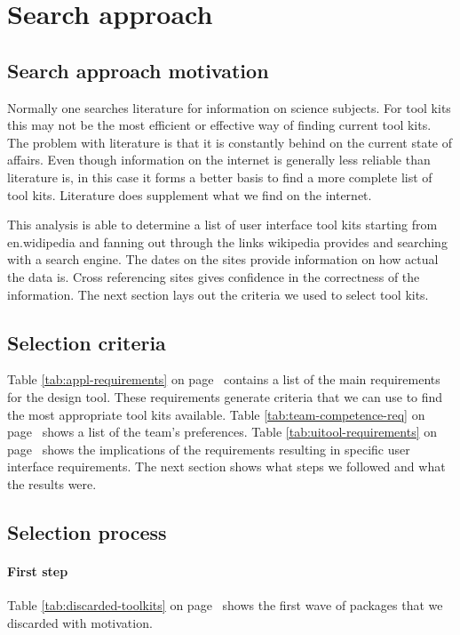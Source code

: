\section{Search approach}

\subsection{Search approach motivation}

Normally one searches literature for information on science subjects. 
For tool kits this may not be the most efficient or effective way of finding 
current tool kits. The problem with literature is that it is constantly
behind on the current state of affairs. Even though information on the internet 
is generally less reliable than literature is, in this case it forms a better 
basis to find a more complete list of tool kits. Literature does supplement 
what we find on the internet.

This analysis is able to determine a list of user interface tool kits starting 
from en.widipedia and fanning out through the links wikipedia provides and 
searching with a search engine. The dates on the sites provide information on how 
actual the data is. Cross referencing sites gives confidence in the correctness 
of the information. The next section lays out the criteria we used to select 
tool kits.

\subsection{Selection criteria}

Table \ref{tab:appl-requirements} on page~\pageref{tab:appl-requirements} contains 
a list of the main requirements for the design tool. These requirements generate 
criteria that we can use to find the most appropriate tool kits available. 
Table \ref{tab:team-competence-req} on page~\pageref{tab:team-competence-req}
shows a list of the team's preferences. Table \ref{tab:uitool-requirements} 
on page~\pageref{tab:uitool-requirements}
shows the implications of the requirements resulting in specific user interface 
requirements. The next section shows what steps we followed and what the results 
were.

\subsection{Selection process}

\paragraph{First step} Table \ref{tab:discarded-toolkits} on page~\pageref{tab:discarded-toolkits} shows the 
first wave of packages that we discarded with motivation. 

